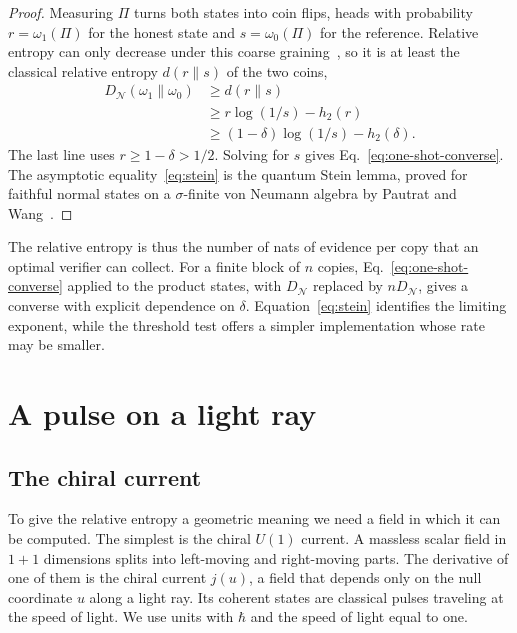 \documentclass[11pt,a4paper]{article}
\newcommand{\N}{\mathcal{N}}
\begin{document}
\begin{proof}
Measuring $\Pi$ turns both states into coin flips, heads with probability $r=\omega_1(\Pi)$ for the honest state and $s=\omega_0(\Pi)$ for the reference. Relative entropy can only decrease under this coarse graining~\cite{uhlmann1977relative}, so it is at least the classical relative entropy $d(r\|s)$ of the two coins,
\begin{equation}
\begin{split}
D_{\N}(\omega_1\|\omega_0)
&\ge d(r\|s)\\
&\ge r\log(1/s)-h_2(r)\\
&\ge(1-\delta)\log(1/s)-h_2(\delta).
\end{split}
\end{equation}
The last line uses $r\ge1-\delta>1/2$. Solving for $s$ gives Eq.~\eqref{eq:one-shot-converse}. The asymptotic equality~\eqref{eq:stein} is the quantum Stein lemma, proved for faithful normal states on a $\sigma$-finite von Neumann algebra by Pautrat and Wang~\cite{hiai1991proper,ogawa2000strong,pautrat2023ke}.
\end{proof}

The relative entropy is thus the number of nats of evidence per copy that an optimal verifier can collect. For a finite block of $n$ copies, Eq.~\eqref{eq:one-shot-converse} applied to the product states, with $D_{\N}$ replaced by $nD_{\N}$, gives a converse with explicit dependence on $\delta$. Equation~\eqref{eq:stein} identifies the limiting exponent, while the threshold test offers a simpler implementation whose rate may be smaller.

\section{A pulse on a light ray}
\label{sec:current}

\subsection{The chiral current}

To give the relative entropy a geometric meaning we need a field in which it can be computed. The simplest is the chiral $U(1)$ current. A massless scalar field in $1+1$ dimensions splits into left-moving and right-moving parts. The derivative of one of them is the chiral current $j(u)$, a field that depends only on the null coordinate $u$ along a light ray. Its coherent states are classical pulses traveling at the speed of light. We use units with $\hbar$ and the speed of light equal to one.
\end{document}
